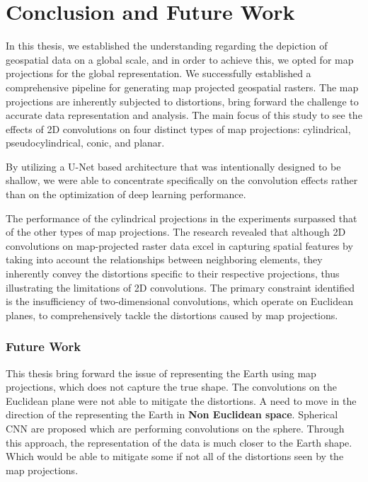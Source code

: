 
\clearpage
\cleardoublepage

\chapter{Conclusion and Future Work}
\label{chap:conclusion_future_work}
In this thesis, we established the understanding regarding the depiction of geospatial data on a global scale, and in order to achieve this, we opted for map projections for the global representation.
We successfully established a comprehensive pipeline for generating map projected geospatial rasters. The map projections are inherently subjected to distortions, bring forward the challenge to accurate data representation and analysis.
The main focus of this study to see the effects of 2D convolutions on four distinct types of map projections: cylindrical, pseudocylindrical, conic, and planar.

By utilizing a U-Net based architecture that was intentionally designed to be shallow, we were able to concentrate specifically on the convolution effects rather than on the optimization of deep learning performance.

The performance of the cylindrical projections in the experiments surpassed that of the other types of map projections.
The research revealed that although 2D convolutions on map-projected raster data excel in capturing spatial features by taking into account the relationships between neighboring elements,
they inherently convey the distortions specific to their respective projections, thus illustrating the limitations of 2D convolutions.
The primary constraint identified is the insufficiency of two-dimensional convolutions, which operate on Euclidean planes,
to comprehensively tackle the distortions caused by map projections.

\subsection*{Future Work}
This thesis bring forward the issue of representing  the Earth using map projections, which does not capture the true shape.
The convolutions on the Euclidean plane were not able to mitigate the distortions. A need to move in the direction of the representing the Earth in \textbf{Non Euclidean space}.
Spherical CNN are proposed which are performing convolutions on the sphere. Through this approach,
the representation of the data is much closer to the Earth shape. Which would be able to mitigate some if not all of the distortions seen by the map projections.
